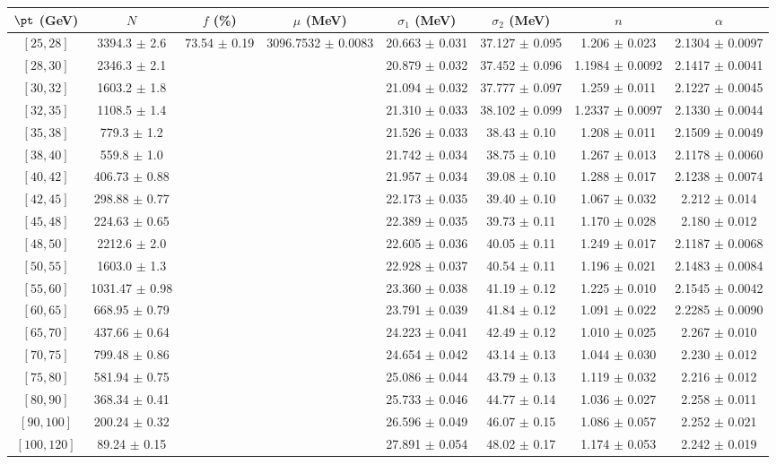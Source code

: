 \begin{tabular}{c||c|c|c|c|c|c|c}
$\pt$ (GeV) & $N$ & $f$ (\%) & $\mu$ (MeV) & $\sigma_1$ (MeV) & $\sigma_2$ (MeV) & $n$ & $\alpha$ \\
\hline
$[25, 28]$ & 3394.3 $\pm$ 2.6 & \multirow{19}{*}{73.54 $\pm$ 0.19} & \multirow{19}{*}{3096.7532 $\pm$ 0.0083} & 20.663 $\pm$ 0.031 & 37.127 $\pm$ 0.095 & 1.206 $\pm$ 0.023 & 2.1304 $\pm$ 0.0097\\
$[28, 30]$ & 2346.3 $\pm$ 2.1 &  &  & 20.879 $\pm$ 0.032 & 37.452 $\pm$ 0.096 & 1.1984 $\pm$ 0.0092 & 2.1417 $\pm$ 0.0041\\
$[30, 32]$ & 1603.2 $\pm$ 1.8 &  &  & 21.094 $\pm$ 0.032 & 37.777 $\pm$ 0.097 & 1.259 $\pm$ 0.011 & 2.1227 $\pm$ 0.0045\\
$[32, 35]$ & 1108.5 $\pm$ 1.4 &  &  & 21.310 $\pm$ 0.033 & 38.102 $\pm$ 0.099 & 1.2337 $\pm$ 0.0097 & 2.1330 $\pm$ 0.0044\\
$[35, 38]$ & 779.3 $\pm$ 1.2 &  &  & 21.526 $\pm$ 0.033 & 38.43 $\pm$ 0.10 & 1.208 $\pm$ 0.011 & 2.1509 $\pm$ 0.0049\\
$[38, 40]$ & 559.8 $\pm$ 1.0 &  &  & 21.742 $\pm$ 0.034 & 38.75 $\pm$ 0.10 & 1.267 $\pm$ 0.013 & 2.1178 $\pm$ 0.0060\\
$[40, 42]$ & 406.73 $\pm$ 0.88 &  &  & 21.957 $\pm$ 0.034 & 39.08 $\pm$ 0.10 & 1.288 $\pm$ 0.017 & 2.1238 $\pm$ 0.0074\\
$[42, 45]$ & 298.88 $\pm$ 0.77 &  &  & 22.173 $\pm$ 0.035 & 39.40 $\pm$ 0.10 & 1.067 $\pm$ 0.032 & 2.212 $\pm$ 0.014\\
$[45, 48]$ & 224.63 $\pm$ 0.65 &  &  & 22.389 $\pm$ 0.035 & 39.73 $\pm$ 0.11 & 1.170 $\pm$ 0.028 & 2.180 $\pm$ 0.012\\
$[48, 50]$ & 2212.6 $\pm$ 2.0 &  &  & 22.605 $\pm$ 0.036 & 40.05 $\pm$ 0.11 & 1.249 $\pm$ 0.017 & 2.1187 $\pm$ 0.0068\\
$[50, 55]$ & 1603.0 $\pm$ 1.3 &  &  & 22.928 $\pm$ 0.037 & 40.54 $\pm$ 0.11 & 1.196 $\pm$ 0.021 & 2.1483 $\pm$ 0.0084\\
$[55, 60]$ & 1031.47 $\pm$ 0.98 &  &  & 23.360 $\pm$ 0.038 & 41.19 $\pm$ 0.12 & 1.225 $\pm$ 0.010 & 2.1545 $\pm$ 0.0042\\
$[60, 65]$ & 668.95 $\pm$ 0.79 &  &  & 23.791 $\pm$ 0.039 & 41.84 $\pm$ 0.12 & 1.091 $\pm$ 0.022 & 2.2285 $\pm$ 0.0090\\
$[65, 70]$ & 437.66 $\pm$ 0.64 &  &  & 24.223 $\pm$ 0.041 & 42.49 $\pm$ 0.12 & 1.010 $\pm$ 0.025 & 2.267 $\pm$ 0.010\\
$[70, 75]$ & 799.48 $\pm$ 0.86 &  &  & 24.654 $\pm$ 0.042 & 43.14 $\pm$ 0.13 & 1.044 $\pm$ 0.030 & 2.230 $\pm$ 0.012\\
$[75, 80]$ & 581.94 $\pm$ 0.75 &  &  & 25.086 $\pm$ 0.044 & 43.79 $\pm$ 0.13 & 1.119 $\pm$ 0.032 & 2.216 $\pm$ 0.012\\
$[80, 90]$ & 368.34 $\pm$ 0.41 &  &  & 25.733 $\pm$ 0.046 & 44.77 $\pm$ 0.14 & 1.036 $\pm$ 0.027 & 2.258 $\pm$ 0.011\\
$[90, 100]$ & 200.24 $\pm$ 0.32 &  &  & 26.596 $\pm$ 0.049 & 46.07 $\pm$ 0.15 & 1.086 $\pm$ 0.057 & 2.252 $\pm$ 0.021\\
$[100, 120]$ & 89.24 $\pm$ 0.15 &  &  & 27.891 $\pm$ 0.054 & 48.02 $\pm$ 0.17 & 1.174 $\pm$ 0.053 & 2.242 $\pm$ 0.019\\
\end{tabular}
